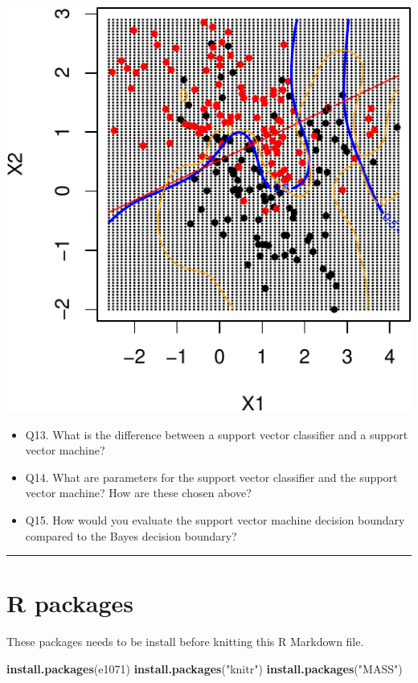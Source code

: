 \documentclass[]{article}
\newenvironment{Shaded}{\begin{snugshade}}{\end{snugshade}}
\newcommand{\KeywordTok}[1]{\textcolor[rgb]{0.13,0.29,0.53}{\textbf{#1}}}
\newcommand{\NormalTok}[1]{#1}
\newcommand{\StringTok}[1]{\textcolor[rgb]{0.31,0.60,0.02}{#1}}
\providecommand{\tightlist}{%
  \setlength{\itemsep}{0pt}\setlength{\parskip}{0pt}}
\begin{document}
\includegraphics{9SVM_files/figure-latex/unnamed-chunk-31-1.pdf}

\begin{itemize}
\tightlist
\item
  Q13. What is the difference between a support vector classifier and a
  support vector machine?
\item
  Q14. What are parameters for the support vector classifier and the
  support vector machine? How are these chosen above?
\item
  Q15. How would you evaluate the support vector machine decision
  boundary compared to the Bayes decision boundary?
\end{itemize}

\begin{center}\rule{0.5\linewidth}{\linethickness}\end{center}

\hypertarget{r-packages}{%
\section{R packages}\label{r-packages}}

These packages needs to be install before knitting this R Markdown file.

\begin{Shaded}
\begin{Highlighting}[]
\KeywordTok{install.packages}\NormalTok{(e1071)}
\KeywordTok{install.packages}\NormalTok{(}\StringTok{"knitr"}\NormalTok{)}
\KeywordTok{install.packages}\NormalTok{(}\StringTok{"MASS"}\NormalTok{)}
\end{Highlighting}
\end{Shaded}
\end{document}
